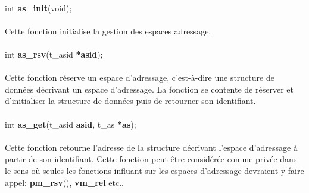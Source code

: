 \documentclass[10pt,a4wide]{article}
\begin{document}
\paragraph{}

\hspace{1.5cm}int \textbf{as\_init}(void);

\paragraph{}

Cette fonction initialise la gestion des espaces adressage.

\paragraph{}

\hspace{1.5cm}int \textbf{as\_rsv}(t\_asid \textbf{*asid});

\paragraph{}

Cette fonction r\'eserve un espace d'adressage, c'est-\`a-dire une structure
de donn\'ees d\'ecrivant un espace d'adressage. La fonction se contente
de r\'eserver et d'initialiser la structure de donn\'ees puis de retourner
son identifiant.

\paragraph{}

\hspace{1.5cm}int \textbf{as\_get}(t\_asid \textbf{asid},
                                   t\_as \textbf{*as});

\paragraph{}

Cette fonction retourne l'adresse de la structure d\'ecrivant l'espace
d'adressage \`a partir de son identifiant. Cette fonction peut \^etre
consid\'er\'ee comme priv\'ee dans le sens o\`u seules les fonctions
influant sur les espaces d'adressage devraient y faire appel:
\textbf{pm\_rsv}(), \textbf{vm\_rel} etc..

\paragraph{}
\end{document}
